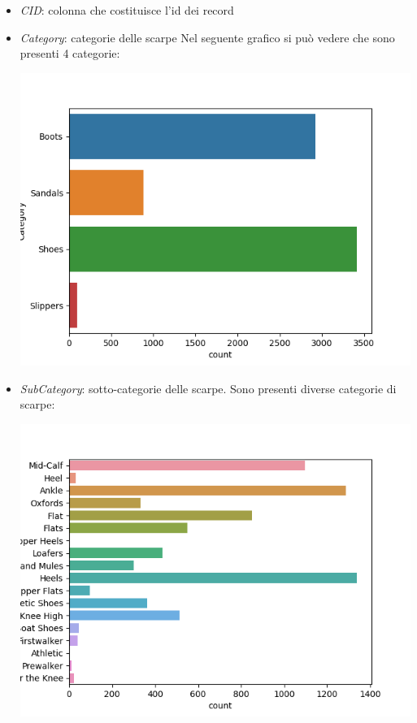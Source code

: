 \documentclass[a4paper, 11pt, oneside]{report}
\begin{document}
                \begin{itemize}
                    \item \textit{CID}: colonna che costituisce l'id dei record
                    \item \textit{Category}: categorie delle scarpe
                    Nel seguente grafico si può vedere che sono presenti 4 categorie:
                    \begin{center}
                        \includegraphics[scale=0.4]{CategoryShoes}
                    \end{center}
                    \item \textit{SubCategory}: sotto-categorie delle scarpe.
                    Sono presenti diverse categorie di scarpe:
                    \begin{center}
                        \includegraphics[scale=0.4]{SubCategoryShoes}

\end{center}
\end{itemize}
\end{document}
